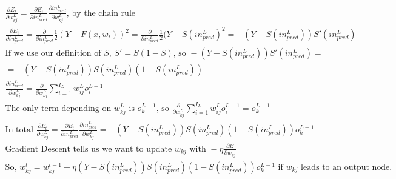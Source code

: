 \documentclass[11pt]{article}
\begin{document}
\begin{gather*}
\frac{\partial E_{t}}{\partial w_{kj}^{L}} = 
\frac{\partial E_{t}}{\partial in_{pred}^{L}} 
\frac{\partial in_{pred}^{L}}{\partial w_{kj}^{L}}
\text{, by the chain rule}\\
\frac{\partial E_{t}}{\partial in_{pred}^{L}} = 
\frac{\partial}{\partial in_{pred}^{L}} \frac{1}{2} (Y - F(x, w_{t}))^{2} = 
\frac{\partial}{\partial in_{pred}^{L}} \frac{1}{2} (Y - S(in_{pred}^{L})^{2} = 
- (Y - S(in_{pred}^{L})) S'(in_{pred}^{L})\\
\text{If we use our definition of } S \text{, } S' = S (1 - S) \text{, so } 
- (Y - S(in_{pred}^{L})) S'(in_{pred}^{L}) = \\
= - (Y - S(in_{pred}^{L})) S(in_{pred}^{L}) (1 - S(in_{pred}^{L}))\\
\frac{\partial in_{pred}^{L}}{\partial w_{kj}^{L}} = 
\frac{\partial}{\partial w_{kj}^{L}} 
\sum_{i = 1}^{I_{L}} w_{ij}^{L} o_{i}^{L - 1}\\
\text{The only term depending on } w_{kj}^{L} \text{ is } o_{k}^{L - 1} 
\text{, so } 
\frac{\partial}{\partial w_{kj}^{L}} 
\sum_{i = 1}^{I_{L}} w_{ij}^{L} o_{i}^{L - 1} = 
o_{k}^{L - 1}\\
\text{In total } 
\frac{\partial E_{t}}{\partial w_{kj}^{L}} = 
\frac{\partial E_{t}}{\partial in_{pred}^{L}} 
\frac{\partial in_{pred}^{L}}{\partial w_{kj}^{L}} = 
- (Y - S(in_{pred}^{L})) S(in_{pred}^{L}) (1 - S(in_{pred}^{L})) o_{k}^{L - 1}\\
\text{Gradient Descent tells us we want to update } w_{kj} \text{ with } 
- \eta \frac{\partial E}{\partial w_{kj}}\\
\text{So, } w_{kj}^{t} = w_{kj}^{t - 1} + 
\eta (Y - S(in_{pred}^{L})) S(in_{pred}^{L}) (1 - S(in_{pred}^{L})) o_{k}^{L - 1} 
\text{ if } w_{kj} \text{ leads to an output node.}
\end{gather*}
\end{document}
